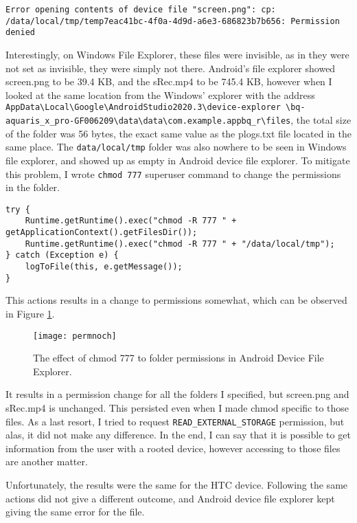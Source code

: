 \documentclass[
  a4paper,  %
  twoside,  %
  bibliography=totoc,
  headsepline,
  cleardoublepage=empty,
  parskip=half,
  draft=false,
  open=any
]{scrbook}
\begin{document}
\begin{lstlisting}
Error opening contents of device file "screen.png": cp: /data/local/tmp/temp7eac41bc-4f0a-4d9d-a6e3-686823b7b656: Permission denied
\end{lstlisting}
Interestingly, on Windows File Explorer, these files were invisible, as in they were not set as invisible, they were simply not there. Android's file explorer showed screen.png to be 39.4 KB, and the sRec.mp4 to be 745.4 KB, however when I looked at the same location from the Windows' explorer with the address \texttt{AppData\textbackslash Local\textbackslash Google\textbackslash AndroidStudio2020.3\textbackslash device-explorer
\textbackslash bq-aquaris\_x\_pro-GF006209\textbackslash data\textbackslash data\textbackslash com.example.appbq\_r\textbackslash files}, the total size of the folder was 56 bytes, the exact same value as the plogs.txt file located in the same place. The \texttt{data/local/tmp} folder was also nowhere to be seen in Windows file explorer, and showed up as empty in Android device file explorer. To mitigate this problem, I wrote \texttt{chmod 777} superuser command to change the permissions in the folder.
\begin{lstlisting}
try {
	Runtime.getRuntime().exec("chmod -R 777 " + getApplicationContext().getFilesDir());
	Runtime.getRuntime().exec("chmod -R 777 " + "/data/local/tmp");
} catch (Exception e) {
	logToFile(this, e.getMessage());
}
\end{lstlisting}
This actions results in a change to permissions somewhat, which can be observed in Figure \ref{permnoch}.
\begin{figure}\centering
	\texttt{[image: permnoch]}
	\caption{The effect of chmod 777 to folder permissions in Android Device File Explorer.}
	\label{permnoch}
\end{figure}
It results in a permission change for all the folders I specified, but screen.png and sRec.mp4 is unchanged. This persisted even when I made chmod specific to those files. As a last resort, I tried to request \texttt{READ\_EXTERNAL\_STORAGE} permission, but alas, it did not make any difference. In the end, I can say that it is possible to get information from the user with a rooted device, however accessing to those files are another matter.

Unfortunately, the results were the same for the HTC device. Following the same actions did not give a different outcome, and Android device file explorer kept giving the same error for the file.
\end{document}
